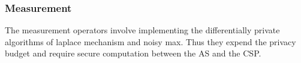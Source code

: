 \subsubsection{Measurement} The measurement operators involve implementing the differentially private algorithms of laplace mechanism and noisy max.  Thus they expend the privacy budget and require secure computation between the AS and the CSP. 
\begin{comment} All measurement operators must involve joint computation with the CSP. Note that the requisite noise to be added to ensure differentially privacy has to be jointly added by both the AS and the CSP. It is so because, had only either one of the servers added the noise, then that server would be able to retrieve the true non-noisy answer by simply de-noising the published differentially private answer. This means that the sensitivity of the program being executed should be known to both the servers. This poses no hindrance in our setting  since the program is public, the  sensitivity computation can be performed very easily by observing the sequence of the preceding transformations.
\end{comment}

